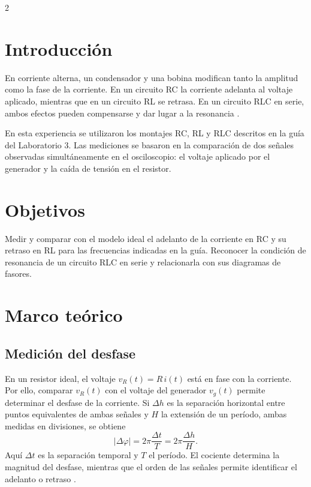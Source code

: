 \documentclass[10pt,letterpaper]{article}
\begin{document}
\begin{multicols}{2}
\raggedcolumns

\section{Introducción}

En corriente alterna, un condensador y una bobina modifican tanto la amplitud como la fase de la corriente. 
En un circuito RC la corriente adelanta al voltaje aplicado, mientras que en un circuito RL se retrasa.
 En un circuito RLC en serie, ambos efectos pueden compensarse y dar lugar a la resonancia \cite{young2009}.

En esta experiencia se utilizaron los montajes RC, RL y RLC descritos en la guía del Laboratorio 3.
 Las mediciones se basaron en la comparación de dos señales observadas simultáneamente en el osciloscopio: el voltaje aplicado por el generador y la caída de tensión en el resistor.

\section{Objetivos}
Medir y comparar con el modelo ideal el adelanto de la corriente en RC y su retraso en RL para las frecuencias indicadas en la guía.
 Reconocer la condición de resonancia de un circuito RLC en serie y relacionarla con sus diagramas de fasores.


\section{Marco teórico}

\subsection{Medición del desfase}

En un resistor ideal, el voltaje $v_R(t)=R\,i(t)$ está en fase con la corriente. Por ello, comparar $v_R(t)$ con el voltaje del generador $v_g(t)$ permite determinar el desfase de la corriente. Si $\Delta h$ es la separación horizontal entre puntos equivalentes de ambas señales y $H$ la extensión de un período, ambas medidas en divisiones, se obtiene
\begin{equation}
  |\Delta\varphi|=2\pi\frac{\Delta t}{T}
  =2\pi\frac{\Delta h}{H}.
  \label{eq:fase}
\end{equation}
Aquí $\Delta t$ es la separación temporal y $T$ el período. El cociente determina la magnitud del desfase, mientras que el orden de las señales permite identificar el adelanto o retraso \cite{manualhameg}.


\end{multicols}
\end{document}
